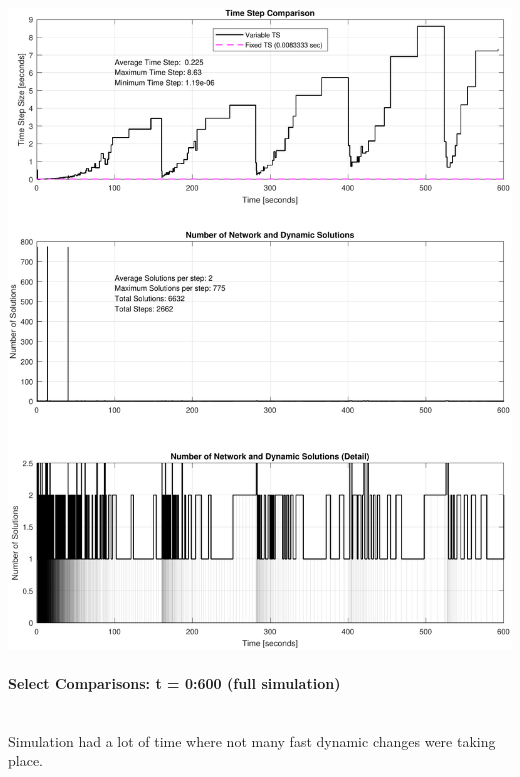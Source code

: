 \documentclass[12pt]{article}
\begin{document}
\includegraphics[width=.97\linewidth]{MWstepComp}

\pagebreak
\paragraph{Select Comparisons: t = 0:600 (full simulation)} \ \\
Simulation had a lot of time where not many fast dynamic changes were taking place. \\
\end{document}
